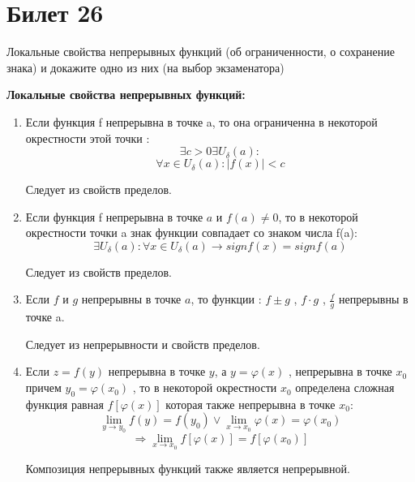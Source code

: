 \documentclass[a4paper,12pt]{article}
\begin{document}
    \section*{Билет 26}
    
    Локальные свойства непрерывных функций (об ограниченности, о сохранение знака) и докажите одно из них (на выбор экзаменатора)

    \textbf{Локальные свойства непрерывных функций:}
        \begin{enumerate}
            
            \item Если функция f непрерывна в точке a, то она ограниченна в некоторой окрестности этой точки :
            $$\exists c>0   \exists U_\delta(a) :$$ 
            $$\forall x \in {U_\delta(a)} : |f(x)| < c$$ 
            
            Следует из свойств пределов.
            
            \item Если функция f непрерывна в точке $a$ и $f(a)\neq  0$, то в некоторой окрестности точки a знак функции совпадает со знаком числа f(a):
            $$\exists U_\delta(a) : \forall x \in {U_\delta(a)} \rightarrow sign f(x)=sign f(a) $$
            
            Следует из свойств пределов.
            
            \item Если $f$ и $g$ непрерывны в точке $a$, то функции :
            $f \pm g$ , $f\cdot g$ , $\frac{f}{g}$  непрерывны в точке a.
            
            Следует из непрерывности и свойств пределов.
            
            \item Если $z=f(y)$ непрерывна в точке $y$, а $y=\varphi(x)$  , непрерывна в точке $x_0$ причем $y_0=\varphi(x_0)$  , то в некоторой окрестности $x_0$  определена сложная функция равная $f[\varphi(x)]$  которая также непрерывна в точке $x_0 $:
                       $$ \lim\limits_{y\to y_0}f(y)=f(y_0) \vee \lim\limits_{x\to x_0}\varphi(x)=\varphi(x_0)$$
                    $$\Rightarrow \lim\limits_{x\to x_0}f[\varphi(x)]=f[\varphi(x_0)] $$  

            Композиция непрерывных функций также является непрерывной.

        \end{enumerate}
\end{document}
